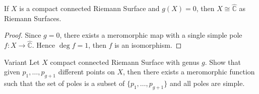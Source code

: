 \begin{corollary}{}
    If \(X\) is a compact connected Riemann Surface and \(g{(X)} = 0\), then \(X
    \cong \widehat{\mathbb{C}}\) as Riemann Surfaces.
\end{corollary}
\begin{proof}{}
    Since \(g=0\), there exists a meromorphic map with a single simple pole \(f
    : X \to \widehat{\mathbb{C}}\). Hence \(\deg f = 1\), then \(f\) is an
    isomorphism.
\end{proof}

\begin{eser}{Variant}
    Let \(X\) compact connected Riemann Surface with genus \(g\).
    Show that given \(p_{1}, \dots, p_{g+1} \) different points on \(X\), then
    there exists a meromorphic function such that the set of poles is a subset
    of \(\{p_{1}, \dots, p_{g+1}\} \) and all poles are simple.
\end{eser}




